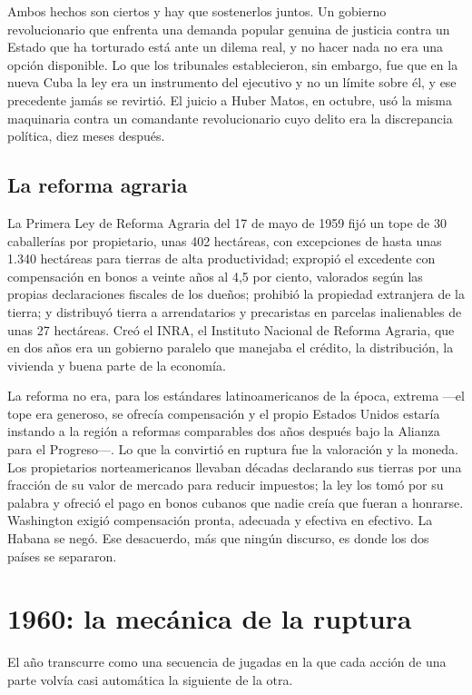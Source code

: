 Ambos hechos son ciertos y hay que sostenerlos juntos. Un gobierno revolucionario
que enfrenta una demanda popular genuina de justicia contra un Estado que ha
torturado está ante un dilema real, y no hacer nada no era una opción disponible.
Lo que los tribunales establecieron, sin embargo, fue que en la nueva Cuba la ley
era un instrumento del ejecutivo y no un límite sobre él, y ese precedente jamás
se revirtió. El juicio a Huber Matos, en octubre, usó la misma maquinaria contra
un comandante revolucionario cuyo delito era la discrepancia política, diez meses
después.

\subsection{La reforma agraria}

La Primera Ley de Reforma Agraria del 17 de mayo de 1959 fijó un tope de 30
caballerías por propietario, unas 402 hectáreas, con excepciones de hasta unas
1.340 hectáreas para tierras de alta productividad; expropió el excedente con
compensación en bonos a veinte años al 4,5 por ciento, valorados según las
propias declaraciones fiscales de los dueños; prohibió la propiedad extranjera de
la tierra; y distribuyó tierra a arrendatarios y precaristas en parcelas
inalienables de unas 27 hectáreas. Creó el INRA, el Instituto Nacional de Reforma
Agraria, que en dos años era un gobierno paralelo que manejaba el crédito, la
distribución, la vivienda y buena parte de la economía.

La reforma no era, para los estándares latinoamericanos de la época, extrema
---el tope era generoso, se ofrecía compensación y el propio Estados Unidos
estaría instando a la región a reformas comparables dos años después bajo la
Alianza para el Progreso---. Lo que la convirtió en ruptura fue la valoración y
la moneda. Los propietarios norteamericanos llevaban décadas declarando sus
tierras por una fracción de su valor de mercado para reducir impuestos; la ley
los tomó por su palabra y ofreció el pago en bonos cubanos que nadie creía que
fueran a honrarse. Washington exigió compensación pronta, adecuada y efectiva en
efectivo. La Habana se negó. Ese desacuerdo, más que ningún discurso, es donde
los dos países se separaron.

\section{1960: la mecánica de la ruptura}

El año transcurre como una secuencia de jugadas en la que cada acción de una
parte volvía casi automática la siguiente de la otra.


